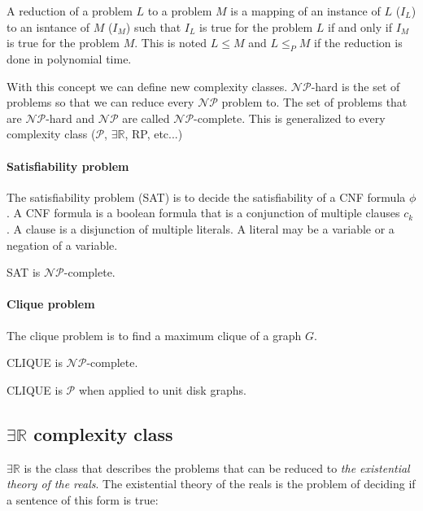 \begin{defn}
  A reduction of a problem $L$ to a problem $M$ is a mapping of an instance of $L$ ($I_L$)
  to an isntance of $M$ ($I_M$) such that $I_L$ is true for the problem $L$ if and
  only if $I_M$ is true for the problem $M$. This is noted $L \leq M$ and $L \leq_P M$
  if the reduction is done in polynomial time.
\end{defn}

With this concept we can define new complexity classes. $\mathcal{NP}$-hard is
the set of problems so that we can reduce every $\mathcal{NP}$ problem to. The set
of problems that are $\mathcal{NP}$-hard and $\mathcal{NP}$ are called $\mathcal{NP}$-complete.
This is generalized to every complexity class ($\mathcal{P}$, $\exists \mathbb{R}$, RP, etc...)

\paragraph{Satisfiability problem} The satisfiability problem (SAT) is to decide the satisfiability
of a CNF formula $\phi$. A CNF formula is a boolean formula that is a conjunction of multiple
clauses $c_k$. A clause is a disjunction of multiple literals. A literal may be a variable
or a negation of a variable.

\begin{theorem}
  SAT is $\mathcal{NP}$-complete.
\end{theorem}

\paragraph{Clique problem} The clique problem is to find a maximum clique of a graph
$G$.

\begin{theorem}
  CLIQUE is $\mathcal{NP}$-complete. \cite{Karp1972}
\end{theorem}

\begin{theorem}
  CLIQUE is $\mathcal{P}$ when applied to unit disk graphs. \cite{CLARK1990165}
\end{theorem}

\subsection{$\exists \mathbb{R}$ complexity class}

$\exists \mathbb{R}$ is the class that describes the problems that can be reduced to
\textit{the existential theory of the reals}\cite{ExistentialTheoryReals2006}. The
existential theory of the reals is the problem of deciding if a sentence of this form
is true:

